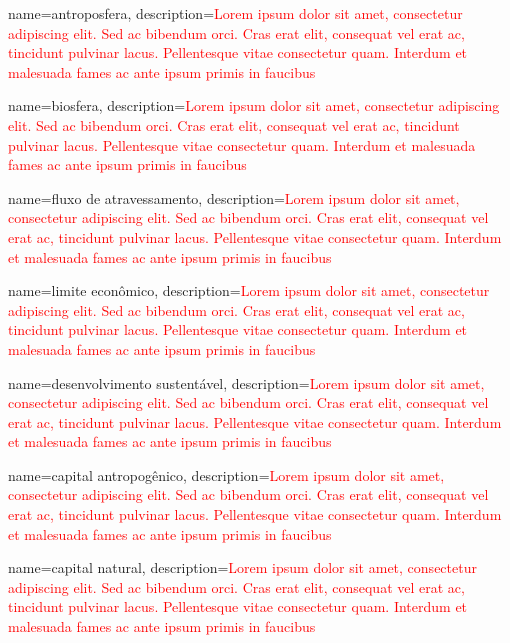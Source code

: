 {
	name=antroposfera,
	description={\textcolor{red}{Lorem ipsum dolor sit amet, consectetur adipiscing elit. Sed ac bibendum orci. Cras erat elit, consequat vel erat ac, tincidunt pulvinar lacus. Pellentesque vitae consectetur quam. Interdum et malesuada fames ac ante ipsum primis in faucibus}}
}

{
	name=biosfera,
	description={\textcolor{red}{Lorem ipsum dolor sit amet, consectetur adipiscing elit. Sed ac bibendum orci. Cras erat elit, consequat vel erat ac, tincidunt pulvinar lacus. Pellentesque vitae consectetur quam. Interdum et malesuada fames ac ante ipsum primis in faucibus}}
}

{
	name=fluxo de atravessamento,
	description={\textcolor{red}{Lorem ipsum dolor sit amet, consectetur adipiscing elit. Sed ac bibendum orci. Cras erat elit, consequat vel erat ac, tincidunt pulvinar lacus. Pellentesque vitae consectetur quam. Interdum et malesuada fames ac ante ipsum primis in faucibus}}
}

{
	name=limite econômico,
	description={\textcolor{red}{Lorem ipsum dolor sit amet, consectetur adipiscing elit. Sed ac bibendum orci. Cras erat elit, consequat vel erat ac, tincidunt pulvinar lacus. Pellentesque vitae consectetur quam. Interdum et malesuada fames ac ante ipsum primis in faucibus}}
}

{
	name=desenvolvimento sustentável,
	description={\textcolor{red}{Lorem ipsum dolor sit amet, consectetur adipiscing elit. Sed ac bibendum orci. Cras erat elit, consequat vel erat ac, tincidunt pulvinar lacus. Pellentesque vitae consectetur quam. Interdum et malesuada fames ac ante ipsum primis in faucibus}}
}

{
	name=capital antropogênico,
	description={\textcolor{red}{Lorem ipsum dolor sit amet, consectetur adipiscing elit. Sed ac bibendum orci. Cras erat elit, consequat vel erat ac, tincidunt pulvinar lacus. Pellentesque vitae consectetur quam. Interdum et malesuada fames ac ante ipsum primis in faucibus}}
}

{
	name=capital natural,
	description={\textcolor{red}{Lorem ipsum dolor sit amet, consectetur adipiscing elit. Sed ac bibendum orci. Cras erat elit, consequat vel erat ac, tincidunt pulvinar lacus. Pellentesque vitae consectetur quam. Interdum et malesuada fames ac ante ipsum primis in faucibus}}
}

